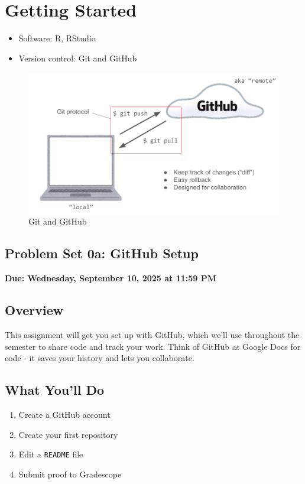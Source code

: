 \documentclass[
  11pt,
  letterpaper]{article}
\providecommand{\tightlist}{%
  \setlength{\itemsep}{0pt}\setlength{\parskip}{0pt}}
\begin{document}
\section{Getting Started}\label{getting-started}

\begin{itemize}
\item
  Software: R, RStudio
\item
  Version control: Git and GitHub
\end{itemize}

\begin{figure}
\centering
\includegraphics[width=0.75\linewidth,height=\textheight,keepaspectratio]{assets/gitvsgithub.png}
\caption{Git and GitHub}
\end{figure}

\newpage

\begin{center}
  \section{Problem Set 0a: GitHub Setup}
  \textbf{Due: Wednesday, September 10, 2025 at 11:59 PM}
\end{center}

\subsection{Overview}\label{overview}

This assignment will get you set up with GitHub, which we'll use
throughout the semester to share code and track your work. Think of
GitHub as Google Docs for code - it saves your history and lets you
collaborate.

\subsection{What You'll Do}\label{what-youll-do}

\begin{enumerate}
\def\labelenumi{\arabic{enumi}.}
\tightlist
\item
  Create a GitHub account
\item
  Create your first repository
\item
  Edit a \texttt{README} file
\item
  Submit proof to Gradescope
\end{enumerate}
\end{document}
